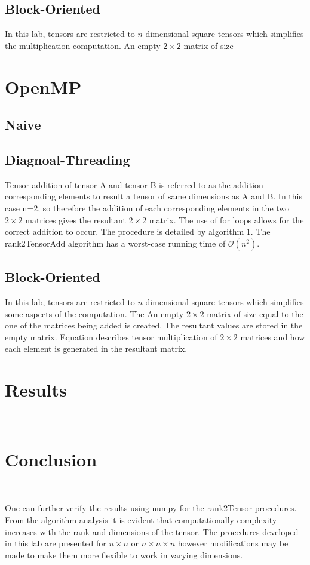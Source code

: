 \documentclass[10pt,journal]{article}
\begin{document}
\newline 

\subsection{Block-Oriented}
In this lab, tensors are restricted to $n$ dimensional square tensors which simplifies the multiplication computation. An empty  $2\times 2$ matrix of size 

\section{OpenMP}



\subsection{Naive}


\subsection{Diagnoal-Threading}
Tensor addition of tensor A and tensor B is referred to as the addition corresponding elements to result a tensor of same dimensions as A and B. In this case n=2, so therefore the addition of each corresponding elements in the two  $2\times 2$ matrices gives the resultant  $2\times 2$ matrix. The use of for loops allows for the correct addition to occur. The procedure is detailed by algorithm 1. The rank2TensorAdd algorithm has a worst-case running time of $\mathcal{O}(n^2)$.

\subsection{Block-Oriented}
In this lab, tensors are restricted to $n$ dimensional square tensors which simplifies some aspects of the computation. The An empty  $2\times 2$ matrix of size equal to the one of the matrices being added is created. The resultant values are stored in the empty matrix. Equation describes tensor multiplication of  $2\times 2$ matrices and how each element is generated in the resultant matrix.


\section{Results}\


\section{Conclusion}\


One can further verify the results using numpy for the rank2Tensor procedures. From the algorithm analysis it is evident that computationally complexity increases with the rank and dimensions of the tensor. The procedures developed in this lab are presented for $n\times n$ or $n\times n\times n$ however modifications may be made to make them more flexible to work in varying dimensions.


\end{document}
